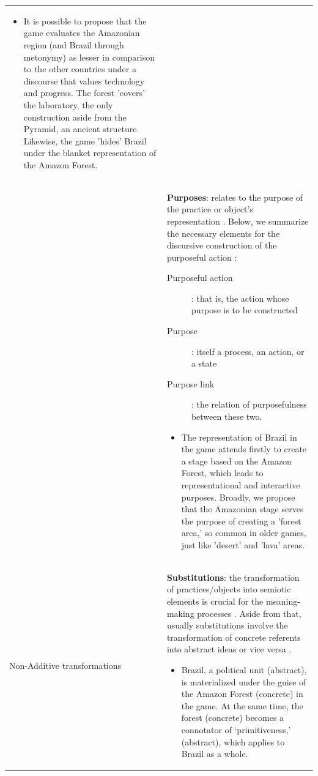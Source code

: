 \documentclass[english]{textolivre}
\begin{document}
\begin{small}
\begin{longtable}{
    >{\raggedright\arraybackslash}p{} 
    >{\raggedright\arraybackslash}p{}  
    }
\begin{itemize}
    \item It is possible to propose that the game evaluates the Amazonian region (and Brazil through metonymy) as lesser in comparison to the other countries under a discourse that values technology and progress. The forest 'covers' the laboratory, the only construction aside from the Pyramid, an ancient structure. Likewise, the game 'hides' Brazil under the blanket representation of the Amazon Forest.
\end{itemize}
\\
& \textbf{Purposes}: relates to the purpose of the practice or object’s representation \cites[p. 21]{van_leeuwen_discourse_2008}. Below, we summarize the necessary elements for the discursive construction of the purposeful action \cites[p. 126]{van_leeuwen_discourse_2008}: 
\begin{description}
    \item[Purposeful action]: that is, the action whose purpose is to be constructed
    \item[Purpose]: itself a process, an action, or a state
    \item[Purpose link]: the relation of purposefulness between these two.
\end{description}
\begin{itemize}
    \item The representation of Brazil in the game attends firstly to create a stage based on the Amazon Forest, which leads to representational and interactive purposes. Broadly, we propose that the Amazonian stage serves the purpose of creating a 'forest area,' so common in older games, just like 'desert' and 'lava' areas.
\end{itemize}
\\
\midrule
Non-Additive transformations & 
\textbf{Substitutions}: the transformation of practices/objects into semiotic elements is crucial for the meaning-making processes \cites[p. 17]{van_leeuwen_discourse_2008}. Aside from that, usually substitutions involve the transformation of concrete referents into abstract ideas or vice versa \cites[p. 111]{van_leeuwen_introducing_2005}.
\begin{itemize}
    \item Brazil, a political unit (abstract), is materialized under the guise of the Amazon Forest (concrete) in the game. At the same time, the forest (concrete) becomes a connotator of ‘primitiveness,’ (abstract), which applies to Brazil as a whole.
\end{itemize}

\end{longtable}
\end{small}
\end{document}
